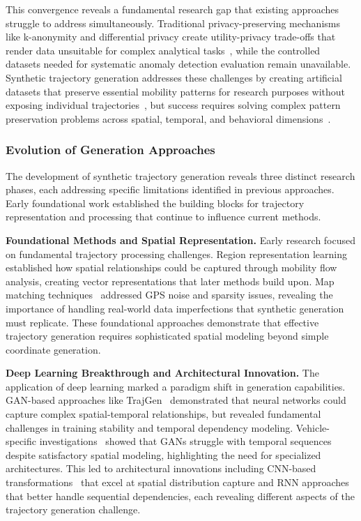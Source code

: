 \documentclass[runningheads]{llncs}
\begin{document}
This convergence reveals a fundamental research gap that existing approaches struggle to address simultaneously. Traditional privacy-preserving mechanisms like k-anonymity and differential privacy create utility-privacy trade-offs that render data unsuitable for complex analytical tasks~\cite{jordon2019pate}, while the controlled datasets needed for systematic anomaly detection evaluation remain unavailable. Synthetic trajectory generation addresses these challenges by creating artificial datasets that preserve essential mobility patterns for research purposes without exposing individual trajectories~\cite{cao2021generating}, but success requires solving complex pattern preservation problems across spatial, temporal, and behavioral dimensions~\cite{kong2023mobility,merhi2024synthetic}.

\subsubsection{Evolution of Generation Approaches}

The development of synthetic trajectory generation reveals three distinct research phases, each addressing specific limitations identified in previous approaches. Early foundational work established the building blocks for trajectory representation and processing that continue to influence current methods.

\textbf{Foundational Methods and Spatial Representation.} Early research focused on fundamental trajectory processing challenges. Region representation learning~\cite{wang2017region} established how spatial relationships could be captured through mobility flow analysis, creating vector representations that later methods build upon. Map matching techniques~\cite{newson2009hidden} addressed GPS noise and sparsity issues, revealing the importance of handling real-world data imperfections that synthetic generation must replicate. These foundational approaches demonstrate that effective trajectory generation requires sophisticated spatial modeling beyond simple coordinate generation.

\textbf{Deep Learning Breakthrough and Architectural Innovation.} The application of deep learning marked a paradigm shift in generation capabilities. GAN-based approaches like TrajGen~\cite{cao2021generating} demonstrated that neural networks could capture complex spatial-temporal relationships, but revealed fundamental challenges in training stability and temporal dependency modeling. Vehicle-specific investigations~\cite{bajarunas2022generative} showed that GANs struggle with temporal sequences despite satisfactory spatial modeling, highlighting the need for specialized architectures. This led to architectural innovations including CNN-based transformations~\cite{merhi2024synthetic} that excel at spatial distribution capture and RNN approaches~\cite{du2016recurrent} that better handle sequential dependencies, each revealing different aspects of the trajectory generation challenge.
\end{document}
